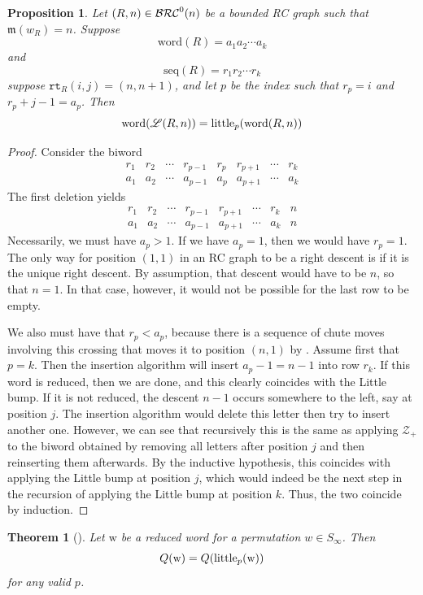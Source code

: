 \documentclass{amsart}
\newtheorem{proposition}[lemma]{Proposition}
\newtheorem{theorem}{Theorem}[section]
\theoremstyle{definition}
\theoremstyle{remark}
\numberwithin{equation}{subsection}
\newcommand{\wof}[1]{w_{#1}}
\newcommand{\rtt}{\mathtt{rt}}
\newcommand{\zeromap}{\mathcal{Z}}
\newcommand{\maxd}{\mathfrak{m}}
\begin{document}
\begin{proposition} \label{proposition:little_bump}
  Let $(R, n)\in \mathcal{BRC}^0(n)$ be a bounded RC graph such that $\maxd(\wof{R}) = n$. Suppose 
  $$\mathrm{word}(R) = a_1 a_2 \cdots a_k$$ 
  and 
  $$\mathrm{seq}(R) = r_1 r_2 \cdots r_k$$ 
  suppose $\rtt_R(i,j)=(n,n+1)$, and let $p$ be the index such that $r_p=i$ and $r_p + j - 1 = a_p$. Then
  $$\mathrm{word}(\mathscr{L}(R, n)) = \mathrm{little}_{p}(\mathrm{word}(R, n))$$
\end{proposition}
\begin{proof}
Consider the biword
$$\begin{matrix}
r_1& r_2& \cdots & r_{p-1} & r_p & r_{p+1} & \cdots & r_k\\
a_1& a_2& \cdots & a_{p-1} & a_p & a_{p+1} & \cdots & a_k
\end{matrix}$$
The first deletion yields
$$\begin{matrix}
r_1& r_2& \cdots & r_{p-1} &  r_{p+1} & \cdots & r_k& n\\
a_1& a_2& \cdots & a_{p-1} &  a_{p+1} & \cdots & a_k& n
\end{matrix}$$
Necessarily, we must have $a_p > 1$. If we have $a_p=1$, then we would have $r_p=1$. The only way for position $(1,1)$ in an RC graph to be a right descent is if it is the unique right descent. By assumption, that descent would have to be $n$, so that $n=1$. In that case, however, it would not be possible for the last row to be empty. 

We also must have that $r_p < a_p$, because there is a sequence of chute moves involving this crossing that moves it to position $(n, 1)$ by \cite[Theorem~3.7]{bbrc}. Assume first that $p = k$. Then the insertion algorithm will insert $a_p - 1=n-1$ into row $r_k$. If this word is reduced, then we are done, and this clearly coincides with the Little bump. If it is not reduced, the descent $n-1$ occurs somewhere to the left, say at position $j$. The insertion algorithm would delete this letter then try to insert another one. However, we can see that recursively this is the same as applying $\zeromap_+$ to the biword obtained by removing all letters after position $j$ and then reinserting them afterwards. By the inductive hypothesis, this coincides with applying the Little bump at position $j$, which would indeed be the next step in the recursion of applying the Little bump at position $k$. Thus, the two coincide by induction.
\end{proof}

\begin{theorem}[{\cite[Theorem~4.4]{hamaker2014relating}}]
Let $\mathrm{w}$ be a reduced word for a permutation $w\in S_\infty$. Then
$$Q(\mathrm{w}) = Q(\mathrm{little}_p(\mathrm{w}))$$
for any valid $p$.
\end{theorem}
\end{document}
